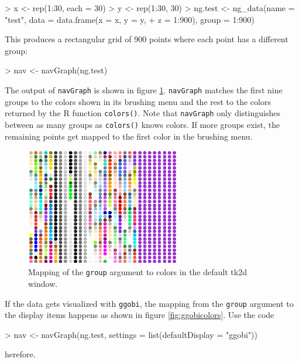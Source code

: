 \documentclass[12pt,oneside,titlepage,letter]{article}
\begin{document}
\begin{Schunk}
\begin{Sinput}
> x <- rep(1:30, each = 30)
> y <- rep(1:30, 30)
> ng.test <- ng_data(name = "test", data = data.frame(x = x, y = y, 
+     z = 1:900), group = 1:900)
\end{Sinput}
\end{Schunk}

This produces a rectangular grid of $900$ points where each point has a different group:

\begin{Schunk}
\begin{Sinput}
> nav <- navGraph(ng.test)
\end{Sinput}
\end{Schunk}

The output of \texttt{navGraph} is shown in figure \ref{fig:tk2dCols}. \texttt{navGraph} matches the first nine groups to the colors shown in its brushing menu and the rest to the colors returned by the R function \texttt{colors()}. Note that \texttt{navGraph} only distinguishes between as many groups as \texttt{colors()} knows colors. If more groups exist, the remaining points get mapped to the first color in the brushing menu.

\begin{figure}[h]
  \label{fig:tk2dCols}
  \centering
  \includegraphics[width = 0.6\textwidth]{img/tk2dcolors.png}
  \caption{Mapping of the \texttt{group} argument to colors in the default tk2d window.}  
\end{figure}

If the data gets visualized with \texttt{ggobi}, the mapping from the \texttt{group} argument to the display items happens as shown in figure \ref{fig:ggobicolors}. Use the code

\begin{Schunk}
\begin{Sinput}
> nav <- navGraph(ng.test, settings = list(defaultDisplay = "ggobi"))
\end{Sinput}
\end{Schunk}
herefore.
\end{document}
